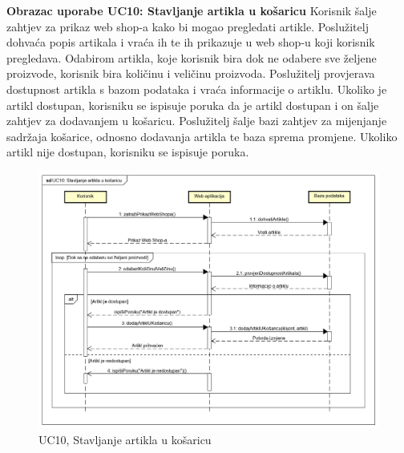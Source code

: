 				\textbf {Obrazac uporabe UC10: Stavljanje artikla u košaricu }
				\bigbreak
				\textnormal {Korisnik šalje zahtjev za prikaz web shop-a kako bi mogao pregledati artikle. Poslužitelj dohvaća popis artikala i vraća ih te ih prikazuje u web shop-u koji korisnik pregledava. Odabirom artikla, koje korisnik bira dok ne odabere sve željene proizvode, korisnik bira količinu i veličinu proizvoda. Poslužitelj provjerava dostupnost artikla s bazom podataka i vraća informacije o artiklu. Ukoliko je artikl dostupan, korisniku se ispisuje poruka da je artikl dostupan i on šalje zahtjev za dodavanjem u košaricu. Poslužitelj šalje bazi zahtjev za mijenjanje sadržaja košarice, odnosno dodavanja artikla te baza sprema promjene. Ukoliko artikl nije dostupan, korisniku se ispisuje poruka.}
				\begin{figure}[H]
					\includegraphics[width=\linewidth]{dijagrami/UC10.png}
					\centering
					\caption{UC10, Stavljanje artikla u košaricu}
					\label{fig:SequanceDiagram1}
				\end{figure}
			\bigskip
			\bigskip
			\bigskip
			
